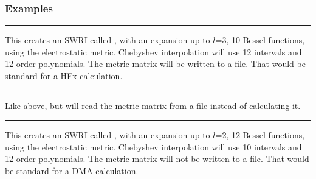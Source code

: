 \documentclass[letterpaper,10pt,english]{sphinxmanual}
\begin{document}
\subsubsection{Examples}
\label{\detokenize{hfx:examples}}

\bigskip\hrule\bigskip


This creates an SWRI called , with an expansion up to
\(l\)=3, 10 Bessel functions, using the electrostatic metric.
Chebyshev interpolation will use 12 intervals and 12-order polynomials.
The metric matrix will be written to a file. That would be standard for
a HFx calculation.

%
\begin{sphinxVerbatim}[commandchars=\\\{\}]
 
        
 
\end{sphinxVerbatim}


\bigskip\hrule\bigskip


Like above, but will read the metric matrix from a file instead of
calculating it.

%
\begin{sphinxVerbatim}[commandchars=\\\{\}]
 
        
 
\end{sphinxVerbatim}


\bigskip\hrule\bigskip


This creates an SWRI called , with an expansion up to
\(l\)=2, 12 Bessel functions, using the electrostatic metric.
Chebyshev interpolation will use 10 intervals and 12-order polynomials.
The metric matrix will not be written to a file. That would be standard
for a DMA calculation.

%
\begin{sphinxVerbatim}[commandchars=\\\{\}]
 
        
 
\end{sphinxVerbatim}
\end{document}
